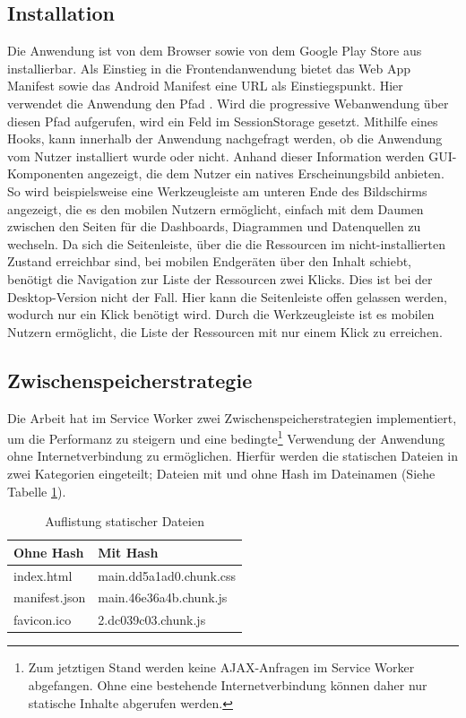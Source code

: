 \subsection{Installation}
\label{subec:installation}
Die Anwendung ist von dem Browser sowie von dem Google Play Store aus installierbar. Als Einstieg
in die Frontendanwendung bietet das Web App Manifest sowie das Android Manifest eine URL als Einstiegspunkt.
Hier verwendet die Anwendung den Pfad . Wird die progressive Webanwendung über diesen Pfad
aufgerufen, wird ein Feld im SessionStorage gesetzt. Mithilfe eines  Hooks, kann innerhalb
der Anwendung nachgefragt werden, ob die Anwendung vom Nutzer installiert wurde oder nicht. Anhand dieser
Information werden GUI-Komponenten angezeigt, die dem Nutzer ein natives Erscheinungsbild anbieten. So wird beispielsweise
eine Werkzeugleiste am unteren Ende des Bildschirms angezeigt, die es den mobilen Nutzern ermöglicht,
einfach mit dem Daumen zwischen den Seiten für die Dashboards, Diagrammen und Datenquellen zu wechseln.
Da sich die Seitenleiste, über die die Ressourcen im nicht-installierten Zustand erreichbar sind, bei mobilen
Endgeräten über den Inhalt schiebt, benötigt die Navigation zur Liste der Ressourcen zwei Klicks. Dies ist
bei der Desktop-Version nicht der Fall. Hier kann die Seitenleiste offen gelassen werden, wodurch nur ein Klick
benötigt wird. Durch die Werkzeugleiste ist es mobilen Nutzern ermöglicht, die Liste der Ressourcen mit nur einem
Klick zu erreichen.


\subsection{Zwischenspeicherstrategie}
\label{subsec:zwischenspeicherstrategie}
Die Arbeit hat im Service Worker zwei Zwischenspeicherstrategien implementiert,
um die Performanz zu steigern und eine bedingte\footnote{Zum jetztigen Stand
werden keine AJAX-Anfragen im Service Worker abgefangen. Ohne eine bestehende Internetverbindung
können daher nur statische Inhalte abgerufen werden.}
Verwendung der Anwendung ohne Internetverbindung zu ermöglichen. Hierfür werden die statischen Dateien in zwei
Kategorien eingeteilt; Dateien mit und ohne Hash im Dateinamen (Siehe Tabelle \ref{tab:auflistungstatischerdateien}).

\begin{table}[h]
\begin{center}
\begin{tabular}{ll}
Ohne Hash & Mit Hash\\
\hline
index.html & main.dd5a1ad0.chunk.css\\
manifest.json & main.46e36a4b.chunk.js\\
favicon.ico & 2.dc039c03.chunk.js\\
\end{tabular}
\end{center}
\caption{Auflistung statischer Dateien}
\label{tab:auflistungstatischerdateien}
\end{table}


